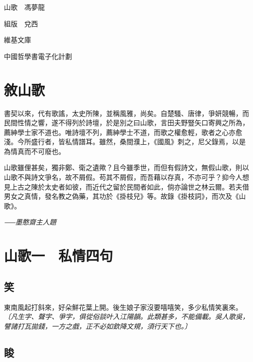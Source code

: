 \begin{titlepage}
\vspace*{5em}

{\Huge 山歌　馮夢龍}

\vfill

\hfill{\Large 組版　兌西　　　　　}

\vspace*{1em}

\hfill{\Large 維基文庫　　　　　　}

\hfill{\Large 中國哲學書電子化計劃}

\vspace*{5em}

\end{titlepage}

\section*{敘山歌}
書契以來，代有歌謠，太史所陳，並稱風雅，尚矣。自楚騷、唐律，爭妍競暢，而民間性情之響，遂不得列於詩壇，於是別之曰山歌，言田夫野豎矢口寄興之所為，薦紳學士家不道也。唯詩壇不列，薦紳學士不道，而歌之權愈輕，歌者之心亦愈淺。今所盛行者，皆私情譜耳。雖然，桑間濮上，《國風》刺之，尼父錄焉，以是為情真而不可廢也。

山歌雖俚甚矣，獨非鄭、衛之遺歟？且今雖季世，而但有假詩文，無假山歌，則以山歌不與詩文爭名，故不屑假。苟其不屑假，而吾藉以存真，不亦可乎？抑今人想見上古之陳於太史者如彼，而近代之留於民間者如此，倘亦論世之林云爾。若夫借男女之真情，發名教之偽藥，其功於《掛枝兒》等。故錄《掛枝詞》，而次及《山歌》。

\hfill\textit{⸺墨憨齋主人題}


\section*{山歌一　私情四句}

\subsection*{笑}

東南風起打斜來，好朵鮮花葉上開。後生娘子家沒要嘻嘻笑，多少私情笑裏來。
\textit{〔凡生字、聲字、爭字，俱從俗談叶入江陽韻。此類甚多，不能備載。吳人歌吳，譬諸打瓦拋錢，一方之戲，正不必如欽降文規，須行天下也。〕}

\subsection*{睃}

